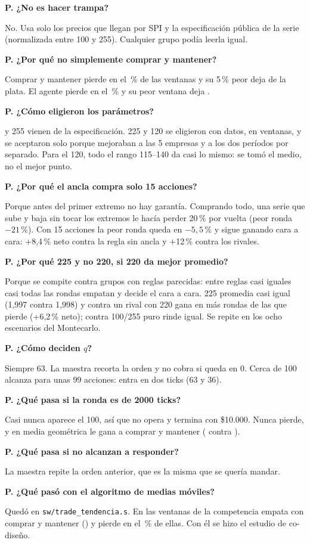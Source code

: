 \documentclass[11pt,letterpaper]{article}
\newcounter{preg}
\newcommand{\preg}[1]{\stepcounter{preg}\par\medskip\noindent\textbf{P\thepreg. #1}\par\noindent}
\begin{document}
\preg{¿No es hacer trampa?}
No. Usa solo los precios que llegan por SPI y la especificación pública de la serie (normalizada entre
100 y 255). Cualquier grupo podía leerla igual.

\preg{¿Por qué no simplemente comprar y mantener?}
Comprar y mantener pierde en el \CymPierde\,\% de las ventanas y su 5\,\% peor deja \CymPcinco{} de la
plata. El agente pierde en el \ExtPierde\,\% y su peor ventana deja \ExtPeor.

\preg{¿Cómo eligieron los parámetros?}
100 y 255 vienen de la especificación. 225 y 120 se eligieron con datos, en \NVentanas{} ventanas, y se
aceptaron solo porque mejoraban a las 5 empresas y a los dos períodos por separado. Para el 120, todo
el rango 115--140 da casi lo mismo: se tomó el medio, no el mejor punto.

\preg{¿Por qué el ancla compra solo 15 acciones?}
Porque antes del primer extremo no hay garantía. Comprando todo, una serie que sube y baja sin tocar
los extremos le hacía perder 20\,\% por vuelta (peor ronda $-21$\,\%). Con 15 acciones la peor ronda
queda en $-5{,}5$\,\% y sigue ganando cara a cara: +8,4\,\% neto contra la regla sin ancla y +12\,\%
contra los rivales.

\preg{¿Por qué 225 y no 220, si 220 da mejor promedio?}
Porque se compite contra grupos con reglas parecidas: entre reglas casi iguales casi todas las rondas
empatan y decide el cara a cara. 225 promedia casi igual (1,997 contra 1,998) y contra un rival con 220
gana en más rondas de las que pierde (+6,2\,\% neto); contra 100/255 puro rinde igual. Se repite en los
ocho escenarios del Montecarlo.

\preg{¿Cómo deciden $q$?}
Siempre 63. La maestra recorta la orden y no cobra si queda en 0. Cerca de 100 alcanza para unas 99
acciones: entra en dos ticks (63 y 36).

\preg{¿Qué pasa si la ronda es de 2000 ticks?}
Casi nunca aparece el 100, así que no opera y termina con \$10.000. Nunca pierde, y en media geométrica
le gana a comprar y mantener (\ExtCortaGeo{} contra \CymCortaGeo).

\preg{¿Qué pasa si no alcanzan a responder?}
La maestra repite la orden anterior, que es la misma que se quería mandar.

\preg{¿Qué pasó con el algoritmo de medias móviles?}
Quedó en \texttt{sw/trade\_tendencia.s}. En las ventanas de la competencia empata con comprar y mantener
(\TendGeo) y pierde en el \TendPierde\,\% de ellas. Con él se hizo el estudio de co-diseño.
\end{document}
